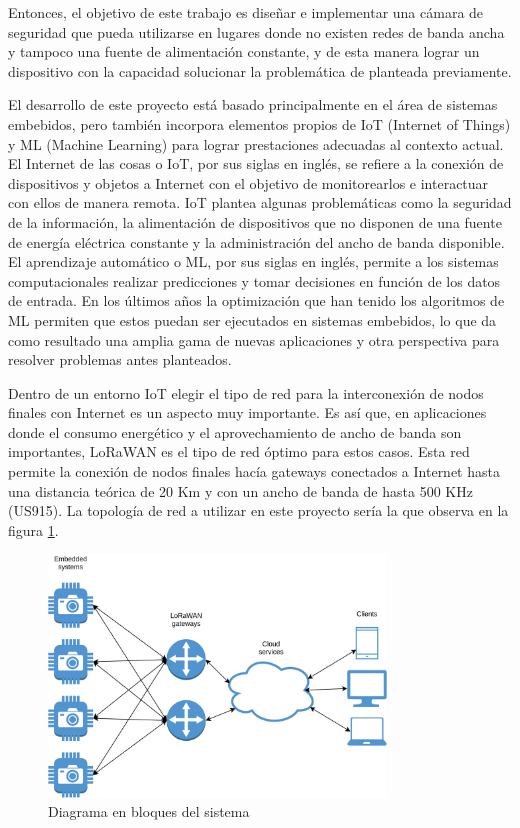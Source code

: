 \documentclass[
11pt, %
codirector, %
]{plan}
\begin{document}
Entonces, el objetivo de este trabajo es diseñar e implementar una cámara de seguridad que pueda utilizarse en lugares donde no existen redes de banda ancha y tampoco una fuente de alimentación constante, y de esta manera lograr un dispositivo con la capacidad solucionar la problemática de planteada previamente.

El desarrollo de este proyecto está basado principalmente en el área de sistemas embebidos, pero también incorpora elementos propios de IoT (Internet of Things) y ML (Machine Learning) para lograr prestaciones adecuadas al contexto actual. El Internet de las cosas o IoT, por sus siglas en inglés, se refiere a la conexión de dispositivos y objetos a Internet con el objetivo de monitorearlos e interactuar con ellos de manera remota. IoT plantea algunas problemáticas como la seguridad de la información, la alimentación de dispositivos que no disponen de una fuente de energía eléctrica constante y la administración del ancho de banda disponible. El aprendizaje automático o ML, por sus siglas en inglés, permite a los sistemas computacionales realizar predicciones y tomar decisiones en función de los datos de entrada. En los últimos años la optimización que han tenido los algoritmos de ML permiten que estos puedan ser ejecutados en sistemas embebidos, lo que da como resultado una amplia gama de nuevas aplicaciones y otra perspectiva para resolver problemas antes planteados.

Dentro de un entorno IoT elegir el tipo de red para la interconexión de nodos finales con Internet es un aspecto muy importante. Es así que, en aplicaciones donde el consumo energético y el aprovechamiento de ancho de banda son importantes, LoRaWAN es el tipo de red óptimo para estos casos. Esta red permite la conexión de nodos finales hacía gateways conectados a Internet hasta una distancia teórica de 20 Km y con un ancho de banda de hasta 500 KHz (US915). La topología de red a utilizar en este proyecto sería la que observa en la figura \ref{fig:topology}.

\begin{figure}[htpb]
\centering 
\includegraphics[width=0.8\textwidth]{./fig/topology.png}
\caption{Diagrama en bloques del sistema}
\label{fig:topology}
\end{figure}
\end{document}

